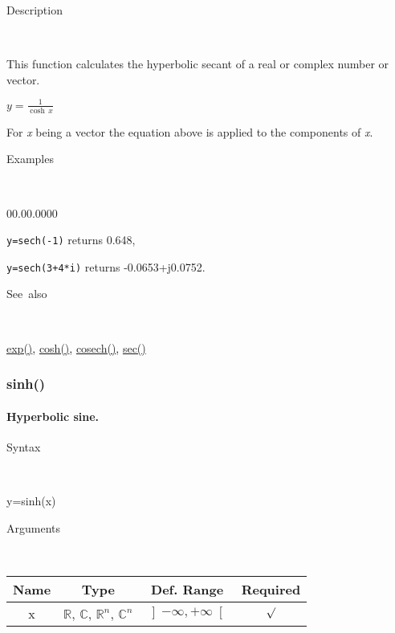 \begin{description}
\item [Description]~
\end{description}
This function calculates the hyperbolic secant of a real or complex
number or vector.

\medskip{}
$y={\displaystyle \frac{1}{\cosh\, x}}$ 
\medskip{}

\noindent For \textit{x} being a vector the equation above is applied
to the components of \textit{x}.

\begin{description}
\item [Examples]~
\end{description}
\begin{lyxlist}{00.00.0000}
\item [\texttt{y=sech(-1)}]returns 0.648,
\item [\texttt{y=sech(3+4{*}i)}]returns -0.0653+j0.0752.
\end{lyxlist}
\begin{description}
\item [See~also]~
\end{description}
\textcolor{blue}{\hyperlink{exp}{exp()}}\textcolor{black}{,} \textcolor{blue}{\hyperlink{cosh}{cosh()}}\textcolor{black}{,}
\textcolor{blue}{\hyperlink{cosech}{cosech()}}\textcolor{black}{,}
\textcolor{blue}{\hyperlink{sec}{sec()}}


\newpage
\subsubsection*{\hypertarget{sinh}{}{\Large sinh()}}


\paragraph{\label{par:Hyperbolic-sine}Hyperbolic sine.}

\begin{description}
\item [Syntax]~
\end{description}
y=sinh(x)

\begin{description}
\item [Arguments]~
\end{description}
\begin{tabular}{|c|c|c|c|}
\hline 
Name&
Type&
Def. Range&
Required\tabularnewline
\hline
\hline 
x&
$\mathbb{R}$, $\mathbb{C}$, $\mathbb{R}^{n}$, $\mathbb{C}^{n}$&
$\left]-\infty,+\infty\right[$&
$\surd$\tabularnewline
\hline
\end{tabular}

